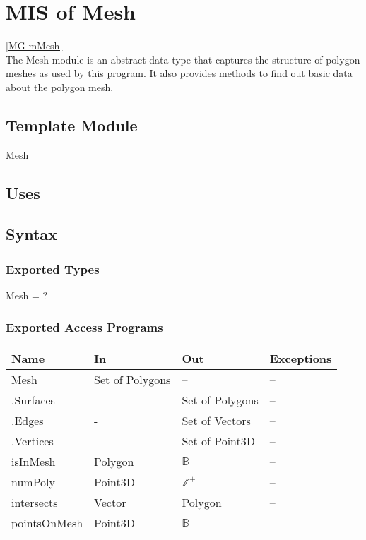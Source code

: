 \documentclass[12pt, titlepage]{article}
\begin{document}
\section{MIS of Mesh} \ref{MG-mMesh} \\
The Mesh module is an abstract data type that captures the structure of polygon 
meshes as used by this program. It also provides methods to find out basic data 
about the polygon mesh.

\subsection{Template Module}
Mesh

\subsection{Uses}

\subsection{Syntax}
\subsubsection{Exported Types}
Mesh = ?

\subsubsection{Exported Access Programs}
\begin{center}
	\begin{tabular}{p{2cm} p{4cm} p{4cm} p{2cm}}
		\hline
		\textbf{Name} & \textbf{In} & \textbf{Out} & \textbf{Exceptions} \\
		\hline
		Mesh & Set of Polygons & -- & -- \\
		.Surfaces & - & Set of Polygons & -- \\
		.Edges & - & Set of Vectors & -- \\
		.Vertices & - & Set of Point3D & -- \\
		isInMesh & Polygon & $\mathbb{B}$ & -- \\ %
		numPoly & Point3D & $\mathbb{Z^+}$ & -- \\ %
		intersects & Vector & Polygon & -- \\ %
		pointsOnMesh & Point3D & $\mathbb{B}$ & -- \\
		\hline
	\end{tabular}
\end{center}
\end{document}
